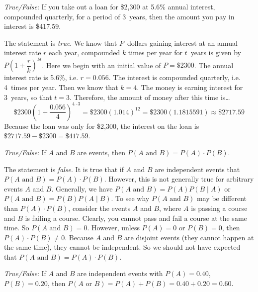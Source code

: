 \documentclass[11pt,letterpaper]{article}
\begin{document}
\quizsol \textit{True/False}: If you take out a loan for \$2,300 at 5.6\% annual interest, compounded quarterly, for a period of 3~years, then the amount you pay in interest is \$417.59. \pspace

\sol The statement is \textit{true}. We know that $P$~dollars gaining interest at an annual interest rate $r$ each year, compounded $k$ times per year for $t$~years is given by $P \left(1 + \dfrac{r}{k} \right)^{kt}$. Here we begin with an initial value of $P= \$2300$. The annual interest rate is 5.6\%, i.e. $r= 0.056$. The interest is compounded quarterly, i.e. 4~times per year. Then we know that $k= 4$. The money is earning interest for 3~years, so that $t= 3$. Therefore, the amount of money after this time is\dots
	\[
	\$2300 \left(1 + \dfrac{0.056}{4} \right)^{4 \cdot 3}= \$2300 \left(1.014 \right)^{12}= \$2300(1.1815591) \approx \$2717.59
	\]
Because the loan was only for \$2,300, the interest on the loan is $\$2717.59 - \$2300= \$417.59$. \pvspace{1.5cm}



\quizsol \textit{True/False}: If $A$ and $B$ are events, then $P(A \text{ and } B)= P(A) \cdot P(B)$. \pspace

\sol The statement is \textit{false}. It is true that if $A$ and $B$ are independent events that $P(A \text{ and } B)= P(A) \cdot P(B)$. However, this is not generally true for arbitrary events $A$ and $B$. Generally, we have $P(A \text{ and } B)= P(A) P(B \;|\; A)$ or $P(A \text{ and } B)= P(B) P(A \;|\; B)$. To see why $P(A \text{ and } B)$ may be different than $P(A) \cdot P(B)$, consider the events $A$ and $B$, where $A$ is passing a course and $B$ is failing a course. Clearly, you cannot pass and fail a course at the same time. So $P(A \text{ and } B)= 0$. However, unless $P(A)= 0$ or $P(B)= 0$, then $P(A) \cdot P(B) \neq 0$. Because $A$ and $B$ are disjoint events (they cannot happen at the same time), they cannot be independent. So we should not have expected that $P(A \text{ and } B)= P(A) \cdot P(B)$.  



\quizsol \textit{True/False}: If $A$ and $B$ are independent events with $P(A)= 0.40$, $P(B)= 0.20$, then $P(A \text{ or } B)= P(A) + P(B)= 0.40 + 0.20= 0.60$. \pspace

\sol 
\end{document}
